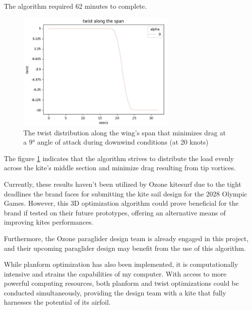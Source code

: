 The algorithm required 62 minutes to complete.

\begin{figure}[H]
    \centering
    \includegraphics[width=0.7\textwidth]{figures/Optimization/3D/twist along the span.png}
    \caption{The twist distribution along the wing's span that minimizes drag at a 9° angle of attack during downwind conditions (at 20 knots)}
    \label{fig:Result of the twist law along the span the gives the minimum drag at 9° in downwind conditions (20 knots)}
\end{figure}

The figure \ref{fig:Result of the twist law along the span the gives the minimum drag at 9° in downwind conditions (20 knots)} indicates that the algorithm strives to distribute the load evenly across the kite's middle section and minimize drag resulting from tip vortices. 

Currently, these results haven't been utilized by Ozone kitesurf due to the tight deadlines the brand faces for submitting the kite sail design for the 2028 Olympic Games. However, this 3D optimization algorithm could prove beneficial for the brand if tested on their future prototypes, offering an alternative means of improving kites performances.

Furthermore, the Ozone paraglider design team is already engaged in this project, and their upcoming paraglider design may benefit from the use of this algorithm.

While planform optimization has also been implemented, it is computationally intensive and strains the capabilities of my computer. With access to more powerful computing resources, both planform and twist optimizations could be conducted simultaneously, providing the design team with a kite that fully harnesses the potential of its airfoil.

